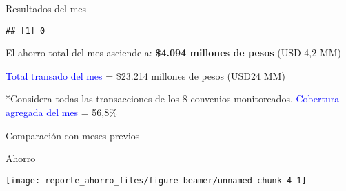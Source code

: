 \documentclass[
  ignorenonframetext,
]{beamer}
\begin{document}
\begin{frame}[fragile]{Resultados del mes}
\protect\hypertarget{resultados-del-mes}{}
\begin{verbatim}
## [1] 0
\end{verbatim}

El ahorro total del mes asciende a: \textbf{\$4.094 millones de pesos}
(USD 4,2 MM)

\begin{table}
\centering
{}
\end{table}

\vspace{0.5cm}

\footnotesize

\textcolor{blue}{Total transado del mes} = \$23.214 millones de pesos
(USD24 MM)

\tiny

*Considera todas las transacciones de los 8 convenios monitoreados.
\center \footnotesize \textcolor{blue}{Cobertura agregada del mes} =
56,8\%
\end{frame}

\begin{frame}{Comparación con meses previos}
\protect\hypertarget{comparaciuxf3n-con-meses-previos}{}
\begin{block}{Ahorro}
\protect\hypertarget{ahorro}{}
\footnotesize

\texttt{[image: reporte\_ahorro\_files/figure-beamer/unnamed-chunk-4-1]}
\end{block}
\end{frame}
\end{document}

